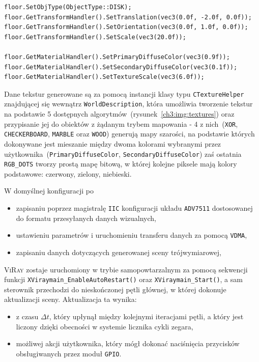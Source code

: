 \begin{lstlisting}[caption=Przykład konfiguracji obiektu \texttt{floor}. Za pomocą odpowiednich funkcji \texttt{Set*()} można dokonać zmiany wartości dowolnych parametrów interpretowanych przez \textsc{ViRay()}]
floor.SetObjType(ObjectType::DISK);
floor.GetTransformHandler().SetTranslation(vec3(0.0f, -2.0f, 0.0f));
floor.GetTransformHandler().SetOrientation(vec3(0.0f, 1.0f, 0.0f));
floor.GetTransformHandler().SetScale(vec3(20.0f));

floor.GetMaterialHandler().SetPrimaryDiffuseColor(vec3(0.9f));
floor.GetMaterialHandler().SetSecondaryDiffuseColor(vec3(0.1f));
floor.GetMaterialHandler().SetTextureScale(vec3(6.0f));
\end{lstlisting}

Dane tekstur generowane są za pomocą instancji klasy typu \texttt{CTextureHelper} znajdującej się wewnątrz \texttt{WorldDescription}, która umożliwia tworzenie tekstur na podstawie 5 dostępnych algorytmów~(rysunek~\ref{ch3:img:textures}) oraz przypisanie jej do obiektów z żądanym trybem mapowania - 4 z nich~(\texttt{XOR}, \texttt{CHECKERBOARD}, \texttt{MARBLE} oraz \texttt{WOOD}) generują mapy szarości, na podstawie których dokonywane jest mieszanie między dwoma kolorami wybranymi przez użytkownika~(\texttt{PrimaryDiffuseColor}, \texttt{SecondaryDiffuseColor}) zaś ostatnia \texttt{RGB\_DOTS} tworzy prostą mapę bitową, w której kolejne piksele mają kolory podstawowe: czerwony, zielony, niebieski.

W domyślnej konfiguracji po
\begin{itemize}
\item zapisaniu poprzez magistralę \texttt{IIC} konfiguracji układu \texttt{ADV7511} dostosowanej do formatu przesyłanych danych wizualnych,
\item ustawieniu parametrów i uruchomieniu transferu danych za pomocą \texttt{VDMA},
\item zapisaniu danych dotyczących generowanej sceny trójwymiarowej,
\end{itemize}
\textsc{ViRay} zostaje uruchomiony w trybie samopowtarzalnym za pomocą sekwencji funkcji \texttt{XViraymain\_EnableAutoRestart()} oraz \texttt{XViraymain\_Start()}, a sam sterownik przechodzi do nieskończonej pętli głównej, w której dokonuje aktualizacji sceny. Aktualizacja ta wynika:
\begin{itemize}
\item z czasu $\Delta t$, który upłynął między kolejnymi iteracjami pętli, a który jest liczony dzięki obecności w systemie licznika cykli zegara,
\item możliwej akcji użytkownika, który mógł dokonać naciśnięcia przycisków obsługiwanych przez moduł \texttt{GPIO}.
\end{itemize}

